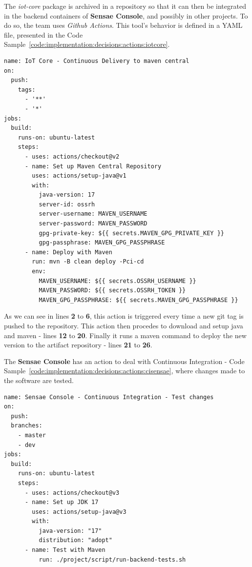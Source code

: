 The \textit{iot-core} package is archived in a repository so that it can then be integrated in the backend containers of \textbf{Sensae Console}, and possibly in other projects. To do so, the team uses \textit{Github Actions}. This tool's behavior is defined in a YAML file, presented in the Code Sample~\ref{code:implementation:decisions:actions:iotcore}.

\begin{lstlisting}[style=yaml, caption=Configuration File for \textit{iot-core} Continuous Delivery, label={code:implementation:decisions:actions:iotcore}]
name: IoT Core - Continuous Delivery to maven central
on:
  push:
    tags:        
      - '**'
      - '*'
jobs:
  build:
    runs-on: ubuntu-latest
    steps:
      - uses: actions/checkout@v2
      - name: Set up Maven Central Repository
        uses: actions/setup-java@v1
        with:
          java-version: 17
          server-id: ossrh
          server-username: MAVEN_USERNAME
          server-password: MAVEN_PASSWORD
          gpg-private-key: ${{ secrets.MAVEN_GPG_PRIVATE_KEY }}
          gpg-passphrase: MAVEN_GPG_PASSPHRASE
      - name: Deploy with Maven
        run: mvn -B clean deploy -Pci-cd
        env:
          MAVEN_USERNAME: ${{ secrets.OSSRH_USERNAME }}
          MAVEN_PASSWORD: ${{ secrets.OSSRH_TOKEN }}
          MAVEN_GPG_PASSPHRASE: ${{ secrets.MAVEN_GPG_PASSPHRASE }}
\end{lstlisting}

As we can see in lines \textbf{2} to \textbf{6}, this action is triggered every time a new git tag is pushed to the repository.
This action then procedes to download and setup java and maven - lines \textbf{12} to \textbf{20}. Finally it runs a maven command to deploy the new version to the artifact repository - lines \textbf{21} to \textbf{26}. 

The \textbf{Sensae Console} has an action to deal with Continuous Integration - Code Sample~\ref{code:implementation:decisions:actions:cisensae}, where changes made to the software are tested.

\begin{lstlisting}[style=yaml, caption=Configuration File for \textbf{Sensae Console} Continuous Integration, label={code:implementation:decisions:actions:cisensae}]
name: Sensae Console - Continuous Integration - Test changes 
on:
  push:
  branches:
    - master
    - dev
jobs:
  build:
    runs-on: ubuntu-latest
    steps:
      - uses: actions/checkout@v3
      - name: Set up JDK 17
        uses: actions/setup-java@v3
        with:
          java-version: "17"
          distribution: "adopt"
      - name: Test with Maven
          run: ./project/script/run-backend-tests.sh
\end{lstlisting}


